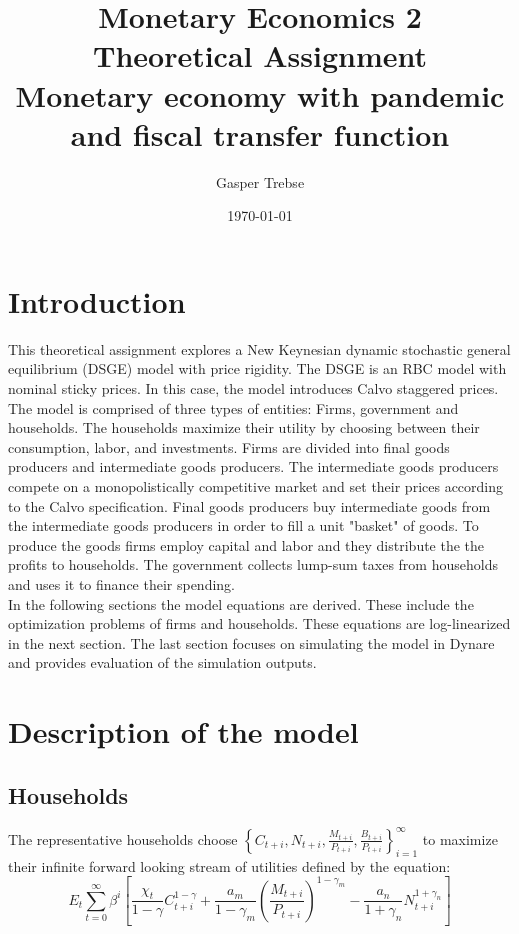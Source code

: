 \documentclass[10pt,a4paper]{article}
\author{Gasper Trebse}
\title{Monetary Economics 2\\
\textbf{Theoretical Assignment} \\
Monetary economy with pandemic and fiscal transfer function}
\date{\today}
\begin{document}
\doublespacing
{}%
\clearpage
\thispagestyle{empty}
\maketitle
\clearpage
\singlespacing
{}%
\tableofcontents 
\bigskip
\listoffigures
\clearpage
{}%
\doublespacing

\section{Introduction}
This theoretical assignment explores a New Keynesian dynamic stochastic general equilibrium (DSGE) model with price rigidity. The DSGE is an RBC model with nominal sticky prices. In this case, the model introduces Calvo staggered prices. The model is comprised of three types of entities: Firms, government and households. The households maximize their utility by choosing between their consumption, labor, and investments. Firms are divided into final goods producers and intermediate goods producers. The intermediate goods producers compete on a monopolistically competitive market and set their prices according to the Calvo specification. Final goods producers buy intermediate goods from the intermediate goods producers in order to fill a unit "basket" of goods. To produce the goods firms employ capital and labor and they distribute the the profits to households. The government collects lump-sum taxes from households and uses it to finance their spending.\\
In the following sections the model equations are derived. These include the optimization problems of firms and households. These equations are log-linearized in the next section. The last section focuses on simulating the model in Dynare and provides evaluation of the simulation outputs.


\section{Description of the model}
\subsection{Households}
The representative households choose 
$\left\lbrace C_{t+i}, N_{t+i}, \frac{M_{t+i}}{P_{t+i}}, \frac{B_{t+i}}{P_{t+i}} \right\rbrace ^{\infty} _{i=1}$
to maximize their infinite forward looking stream of utilities defined by the equation:
\begin{equation}\label{eq:1}
 E_{t} \sum^{\infty}_{t=0} \beta^{i} \left[
\dfrac{\chi_{t}}{1-\gamma} C^{1-\gamma}_{t+i}
+ 
\dfrac{a_{m}}{1-\gamma_{m}} \left(\dfrac{M_{t+i}}{P_{t+i}}\right)^{1-\gamma_{m}}
-
\dfrac{a_{n}}{1+\gamma_{n}} N_{t+i}^{1+\gamma_{n}}
\right]
\end{equation}
\end{document}
